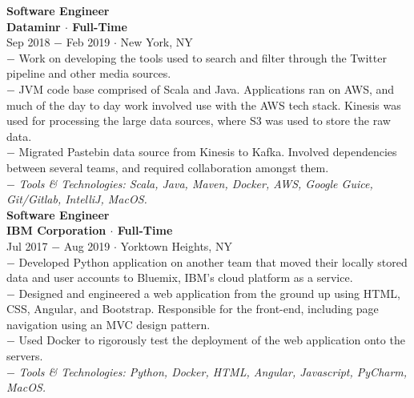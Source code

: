 \documentclass{resume}
\begin{document}
\begin{flushleft}
\normalsize{\bf Software Engineer}\\
\footnotesize{\bf Dataminr $\cdot$ Full-Time}\\
\footnotesize{Sep 2018  $-$ Feb 2019 $\cdot$ New York, NY}\\[1mm]
{\scriptsize
$-$ Work on developing the tools used to search and filter through the Twitter pipeline and other media sources. \\
$-$ JVM code base comprised of Scala and Java. Applications ran on AWS, and much of the day to day work involved use with the AWS tech stack. Kinesis was used for processing the large data sources, where S3 was used to store the raw data.\\
$-$ Migrated Pastebin data source from Kinesis to Kafka. Involved dependencies between several teams, and required collaboration amongst them. \\
$-$ \textit{Tools \& Technologies: Scala, Java, Maven, Docker, AWS, Google Guice, Git/Gitlab, IntelliJ, MacOS.}\\[3mm]
}
\normalsize{\bf Software Engineer}\\
\footnotesize{\bf IBM Corporation $\cdot$ Full-Time}\\
\footnotesize{Jul 2017  $-$ Aug 2019 $\cdot$ Yorktown Heights, NY}\\[1mm]
{\scriptsize
	$-$ Developed Python application on another team that moved their locally stored data and user accounts to Bluemix, IBM's cloud platform as a service. \\
	$-$ Designed and engineered a web application from the ground up using HTML, CSS, Angular, and Bootstrap. Responsible for the front-end, including page navigation using an MVC design pattern. \\
	$-$ Used Docker to rigorously test the deployment of the web application onto the servers. \\
	$-$ \textit{Tools \& Technologies: Python, Docker, HTML, Angular, Javascript, PyCharm, MacOS.}\\[4mm]
}


\end{flushleft}
\end{document}
